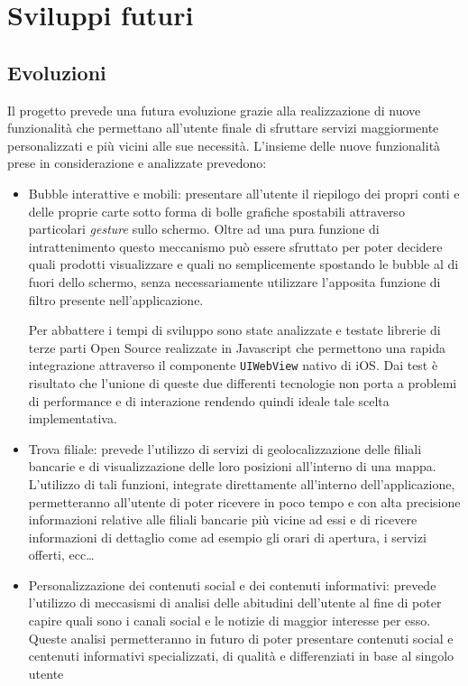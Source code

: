 \chapter{Sviluppi futuri}

\section{Evoluzioni}

Il progetto prevede una futura evoluzione grazie alla realizzazione di nuove funzionalità che permettano all'utente finale di sfruttare servizi maggiormente personalizzati e più vicini alle sue necessità. L'insieme delle nuove funzionalità prese in considerazione e analizzate prevedono:

\begin{itemize}
 \item Bubble interattive e mobili: presentare all'utente il riepilogo dei propri conti e delle proprie carte sotto forma di bolle grafiche spostabili attraverso particolari \emph{gesture} sullo schermo. Oltre ad una pura funzione di intrattenimento questo meccanismo può essere sfruttato per poter decidere quali prodotti visualizzare e quali no semplicemente spostando le bubble al di fuori dello schermo, senza necessariamente utilizzare l'apposita funzione di filtro presente nell'applicazione.
 
 Per abbattere i tempi di sviluppo sono state analizzate e testate librerie di terze parti Open Source realizzate in Javascript che permettono una rapida integrazione attraverso il componente  \texttt{UIWebView}  nativo di iOS. Dai test è risultato che l'unione di queste due differenti tecnologie non porta a problemi di performance e di interazione rendendo quindi ideale tale scelta implementativa.
 
 \item Trova filiale: prevede l'utilizzo di servizi di geolocalizzazione delle filiali bancarie e di visualizzazione delle loro posizioni all'interno di una mappa. L'utilizzo di tali funzioni, integrate direttamente all'interno dell'applicazione, permetteranno all'utente di poter ricevere in poco tempo e con alta precisione informazioni relative alle filiali bancarie più vicine ad essi e di ricevere informazioni di dettaglio come ad esempio gli orari di apertura, i servizi offerti, ecc\dots
 
 \item Personalizzazione dei contenuti social e dei contenuti informativi: prevede l'utilizzo di meccasismi di analisi delle abitudini dell'utente al fine di poter capire quali sono i canali social e le notizie di maggior interesse per esso. Queste analisi permetteranno in futuro di poter presentare contenuti social e centenuti informativi specializzati, di qualità e differenziati in base al singolo utente
 
 
\end{itemize}
